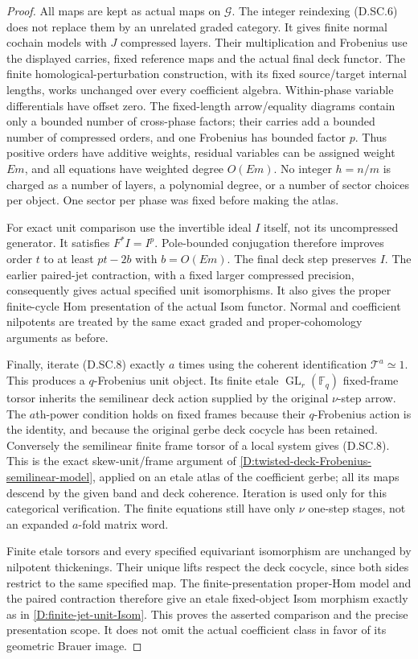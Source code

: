 \begin{proof}
All maps are kept as actual maps on $\mathscr G$.
The integer reindexing (D.SC.6) does not replace
them by an unrelated graded category. It gives
finite normal cochain models with $J$ compressed
layers. Their multiplication and Frobenius use
the displayed carries, fixed reference maps and
the actual final deck functor. The finite
homological-perturbation construction, with its
fixed source/target internal lengths, works
unchanged over every coefficient algebra.
Within-phase variable differentials have offset
zero. The fixed-length arrow/equality diagrams
contain only a bounded number of cross-phase
factors; their carries add a bounded number of
compressed orders, and one Frobenius has bounded
factor $p$. Thus positive orders have additive
weights, residual variables can be assigned
weight $Em$, and all equations have weighted
degree $O(Em)$. No integer $h=n/m$ is charged as
a number of layers, a polynomial degree, or a
number of sector choices per object. One sector
per phase was fixed before making the atlas.

For exact unit comparison use the invertible
ideal $I$ itself, not its uncompressed generator.
It satisfies $F^*I=I^p$. Pole-bounded conjugation
therefore improves order $t$ to at least $pt-2b$
with $b=O(Em)$. The final deck step preserves $I$.
The earlier paired-jet contraction, with a fixed
larger compressed precision, consequently gives
actual specified unit isomorphisms. It also gives
the proper finite-cycle Hom presentation of the
actual Isom functor. Normal and coefficient
nilpotents are treated by the same exact graded
and proper-cohomology arguments as before.

Finally, iterate (D.SC.8) exactly $a$ times using
the coherent identification $\mathscr T^a\simeq1$.
This produces a $q$-Frobenius unit object. Its
finite etale $\operatorname{GL}_r(\mathbb F_q)$
fixed-frame torsor inherits the semilinear deck
action supplied by the original $\nu$-step arrow.
The $a$th-power condition holds on fixed frames
because their $q$-Frobenius action is the identity,
and because the original gerbe deck cocycle has
been retained. Conversely the semilinear finite
frame torsor of a local system gives (D.SC.8).
This is the exact skew-unit/frame argument of
\ref{D:twisted-deck-Frobenius-semilinear-model},
applied on an etale atlas of the coefficient gerbe;
all its maps descend by the given band and deck
coherence. Iteration is used only for this
categorical verification. The finite equations
still have only $\nu$ one-step stages, not an
expanded $a$-fold matrix word.

Finite etale torsors and every specified equivariant
isomorphism are unchanged by nilpotent thickenings.
Their unique lifts respect the deck cocycle, since
both sides restrict to the same specified map.
The finite-presentation proper-Hom model and the
paired contraction therefore give an etale
fixed-object Isom morphism exactly as in
\ref{D:finite-jet-unit-Isom}. This proves the
asserted comparison and the precise presentation
scope. It does not omit the actual coefficient
class in favor of its geometric Brauer image.
\end{proof}
